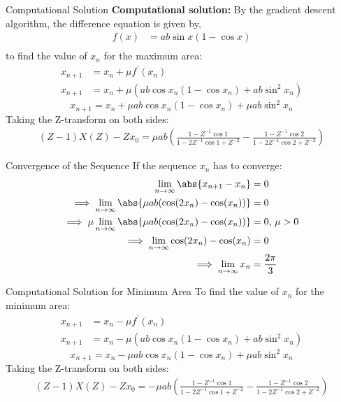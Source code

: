 \documentclass{beamer}
\begin{document}
	\begin{frame}{Computational Solution}
		\textbf{Computational solution:}
		\newline
		By the gradient descent algorithm, the difference equation is given by,
		\begin{align}
			f(x) &= ab \sin{x} (1 - \cos{x}) \\
		\end{align}
		to find the value of $x_n$ for the maximum area:
		\begin{align}
			x_{n + 1} &= x_n + \mu f^{\prime}\left(x_{n}\right) \\
			x_{n + 1} &= x_n + \mu \left(ab \cos{x_{n}} (1 - \cos{x_{n}}) + ab \sin^2{x_{n}}\right)
		\end{align}
		\[
		x_{n+1} = x_n + \mu ab \cos x_n (1 - \cos x_n) + \mu ab \sin^2 x_n
		\]
		Taking the Z-transform on both sides:
		\begin{align}
			(Z-1)X(Z)-Zx_{0}={\mu}ab\left(\frac{1-Z^{-1}\cos{1}}{1-2Z^{-1}\cos{1}+Z^{-2}}-\frac{1-Z^{-1}\cos{2}}{1-2Z^{-1}\cos{2}+Z^{-2}}\right)
		\end{align}
	\end{frame}
	\begin{frame}{Convergence of the Sequence}
		If the sequence $x_n$ has to converge:
		\begin{align}
			\lim_{n\to\infty} \abs{x_{n + 1} - x_n} &= 0 \\
			\implies \lim_{n\to\infty} \abs{{\mu}ab(\cos(2x_{n})-\cos(x_{n}))} &= 0 \\
			\implies \mu \lim_{n\to\infty} \abs{{\mu}ab(\cos(2x_{n})-\cos(x_{n}))} &= 0 \text{, } \mu > 0 \\
			\implies \lim_{n\to\infty} \cos(2x_{n})-\cos(x_{n}) &= 0 \\
			\implies \lim_{n\to\infty} x_{n} &= \frac{2\pi}{3}
		\end{align}
	\end{frame}
	\begin{frame}{Computational Solution for Minimum Area}
		To find the value of $x_n$ for the minimum area:
		\begin{align}
			x_{n + 1} &= x_n - \mu f^{\prime}(x_{n}) \\
			x_{n + 1} &= x_n - \mu \left( ab \cos{x_{n}} (1 - \cos{x_{n}}) + ab \sin^2{x_{n}} \right)
		\end{align}
		\[
		x_{n+1} = x_n - \mu ab \cos x_n (1 - \cos x_n) + \mu ab \sin^2 x_n
		\]
		Taking the Z-transform on both sides:
		\begin{align}
			(Z-1)X(Z) - Zx_{0} = -{\mu}ab\left(\frac{1-Z^{-1}\cos{1}}{1-2Z^{-1}\cos{1}+Z^{-2}} - \frac{1-Z^{-1}\cos{2}}{1-2Z^{-1}\cos{2}+Z^{-2}} \right)
		\end{align}
	\end{frame}
\end{document}
